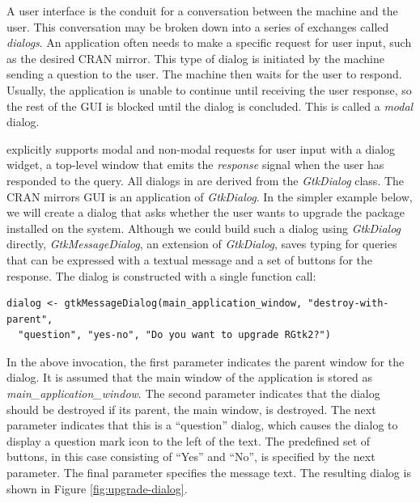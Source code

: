 \documentclass[article]{jss}
\begin{document}
A user interface is the conduit for a conversation between the machine and the
user. This conversation may be broken down into a series of exchanges called 
\emph{dialogs}. An application often needs to make a specific request
for user input, such as the desired CRAN mirror. This type of dialog is 
initiated by the machine sending a question to the user. The machine then
waits for the user to respond. Usually, the application is unable to continue
until receiving the user response, so the rest of the GUI is blocked until
the dialog is concluded. This is called a \emph{modal} dialog.

 explicitly supports modal and non-modal requests for user input with
a dialog widget, a top-level window that emits the \emph{response} signal
when the user has responded to the query. All dialogs in  are derived
from the \emph{GtkDialog} class. The CRAN mirrors GUI is an application
of \emph{GtkDialog}. In the simpler example below,
we will create a dialog that asks whether the user wants to upgrade the 
package installed on the system. Although we could build such a dialog using \emph{GtkDialog}
directly, \emph{GtkMessageDialog}, an extension of \emph{GtkDialog}, saves 
typing for queries that can be expressed with a textual message and a set
of buttons for the response. The dialog is constructed with a single function call:
\begin{verbatim}
dialog <- gtkMessageDialog(main_application_window, "destroy-with-parent", 
  "question", "yes-no", "Do you want to upgrade RGtk2?")
\end{verbatim}
In the above invocation, the first parameter indicates the parent window for
the dialog. It is assumed that the main window of the application is stored 
as \emph{main\_application\_window}. The second parameter indicates that
the dialog should be destroyed if its parent, the main window, is destroyed.
The next parameter indicates that this is a ``question'' dialog, which causes
the dialog to display a question mark icon to the left of the text. The 
predefined set of buttons, in this case consisting of ``Yes'' and ``No'', 
is specified by the next parameter. The final parameter specifies the message text.
The resulting dialog is shown in Figure \ref{fig:upgrade-dialog}.
\end{document}
